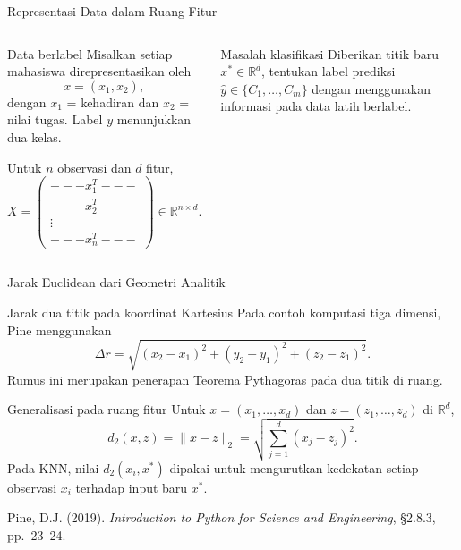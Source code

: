 \documentclass[aspectratio=169,11pt]{beamer}
\begin{document}
\begin{frame}{Representasi Data dalam Ruang Fitur}
\begin{columns}[T]
\begin{block}{Data berlabel}
\small
Misalkan setiap mahasiswa direpresentasikan oleh
\[
x=(x_1,x_2),
\]
dengan $x_1$ = kehadiran dan $x_2$ = nilai tugas. Label $y$ menunjukkan dua kelas.

Untuk $n$ observasi dan $d$ fitur,
\[
X=\begin{pmatrix}
---x_1^T---\\
---x_2^T---\\
\vdots\\
---x_n^T---
\end{pmatrix}\in\mathbb{R}^{n\times d}.
\]
\end{block}
\centering
{}
\vspace{1mm}
\begin{alertblock}{Masalah klasifikasi}
\footnotesize
Diberikan titik baru $x^*\in\mathbb{R}^d$, tentukan label prediksi
$\hat y\in\{C_1,\ldots,C_m\}$ dengan menggunakan informasi pada data latih berlabel.
\end{alertblock}
\end{columns}
\end{frame}

\begin{frame}{Jarak Euclidean dari Geometri Analitik}
\footnotesize
\begin{block}{Jarak dua titik pada koordinat Kartesius}
Pada contoh komputasi tiga dimensi, Pine menggunakan
\[
\Delta r=
\sqrt{(x_2-x_1)^2+(y_2-y_1)^2+(z_2-z_1)^2}.
\]
Rumus ini merupakan penerapan Teorema Pythagoras pada dua titik di ruang.
\end{block}

\begin{block}{Generalisasi pada ruang fitur}
Untuk $x=(x_1,\ldots,x_d)$ dan $z=(z_1,\ldots,z_d)$ di $\mathbb{R}^d$,
\[
d_2(x,z)=\|x-z\|_2
=\sqrt{\sum_{j=1}^{d}(x_j-z_j)^2}.
\]
Pada KNN, nilai $d_2(x_i,x^*)$ dipakai untuk mengurutkan kedekatan setiap
observasi $x_i$ terhadap input baru $x^*$.
\end{block}

\vfill
{\tiny Pine, D.J. (2019). \textit{Introduction to Python for Science and Engineering},
\S2.8.3, pp.~23--24.}
\end{frame}
\end{document}
